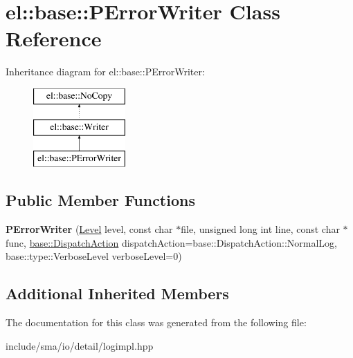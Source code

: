 \hypertarget{classel_1_1base_1_1PErrorWriter}{\section{el\-:\-:base\-:\-:P\-Error\-Writer Class Reference}
\label{classel_1_1base_1_1PErrorWriter}
}
Inheritance diagram for el\-:\-:base\-:\-:P\-Error\-Writer\-:\begin{figure}[H]
\begin{center}
\leavevmode
\includegraphics[height=3.000000cm]{classel_1_1base_1_1PErrorWriter}
\end{center}
\end{figure}
\subsection*{Public Member Functions}
\begin{DoxyCompactItemize}
\item 
\hypertarget{classel_1_1base_1_1PErrorWriter_a60d1ff92d16e3927e2c4b5bb77d34092}{{\bfseries P\-Error\-Writer} (\hyperlink{namespaceel_ab0ac6091262344c52dd2d3ad099e8e36}{Level} level, const char $\ast$file, unsigned long int line, const char $\ast$func, \hyperlink{namespaceel_1_1base_a3aa2563d38e47388ba242a1694fc2839}{base\-::\-Dispatch\-Action} dispatch\-Action=base\-::\-Dispatch\-Action\-::\-Normal\-Log, base\-::type\-::\-Verbose\-Level verbose\-Level=0)}\label{classel_1_1base_1_1PErrorWriter_a60d1ff92d16e3927e2c4b5bb77d34092}

\end{DoxyCompactItemize}
\subsection*{Additional Inherited Members}


The documentation for this class was generated from the following file\-:\begin{DoxyCompactItemize}
\item 
include/sma/io/detail/logimpl.\-hpp\end{DoxyCompactItemize}
